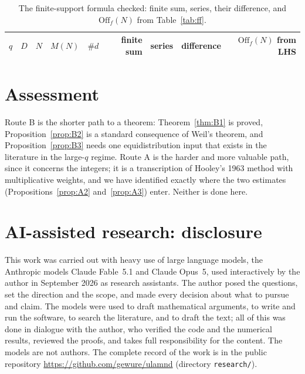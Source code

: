 \documentclass[11pt,a4paper]{article}
\begin{document}
\begin{table}[h]
\centering\footnotesize\setlength{\tabcolsep}{5pt}
\caption{The finite-support formula checked: finite sum, series, their difference, and
$\mathrm{Off}_f(N)$ from Table~\ref{tab:ff}.}\label{tab:fftail}
\begin{tabular}{rlrrrrrrr}
\toprule
$q$ & $D$ & $N$ & $M(N)$ & $\#d$ & finite sum & series & difference & $\mathrm{Off}_f(N)$ from LHS\\
\midrule

\end{tabular}
\end{table}

\section{Assessment}

Route B is the shorter path to a theorem: Theorem~\ref{thm:B1} is proved, Proposition~\ref{prop:B2} is a
standard consequence of Weil's theorem, and Proposition~\ref{prop:B3} needs one equidistribution input
that exists in the literature in the large-$q$ regime. Route A is the harder and more valuable path,
since it concerns the integers; it is a transcription of Hooley's 1963 method with multiplicative weights,
and we have identified exactly where the two estimates (Propositions~\ref{prop:A2} and~\ref{prop:A3})
enter. Neither is done here.

\section*{AI-assisted research: disclosure}
This work was carried out with heavy use of large language models, the Anthropic models Claude Fable~5.1 and
Claude Opus~5, used interactively by the author in September 2026 as research assistants. The author posed the
questions, set the direction and the scope, and made every decision about what to pursue and claim. The models were
used to draft mathematical arguments, to write and run the software, to search the literature, and to draft the text;
all of this was done in dialogue with the author, who verified the code and the numerical results, reviewed the
proofs, and takes full responsibility for the content. The models are not authors. The complete record of the work is
in the public repository \url{https://github.com/gewure/ulamnd} (directory \texttt{research/}).



\end{document}
